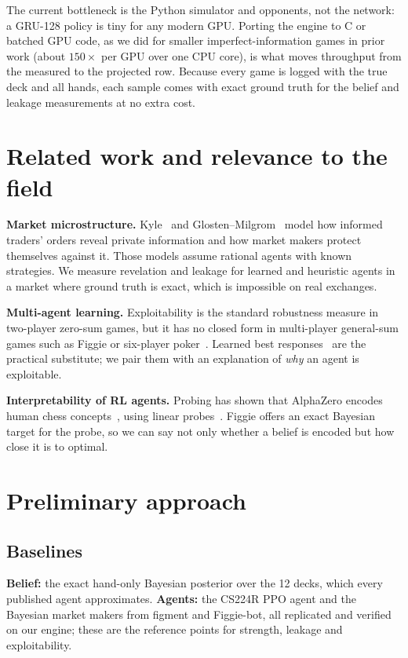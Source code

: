 \documentclass{article}
\begin{document}
The current bottleneck is the Python simulator and opponents, not the network: a GRU-128 policy is tiny for any modern GPU. Porting the engine to C or batched GPU code, as we did for smaller imperfect-information games in prior work (about $150\times$ per GPU over one CPU core), is what moves throughput from the measured to the projected row. Because every game is logged with the true deck and all hands, each sample comes with exact ground truth for the belief and leakage measurements at no extra cost.

\section{Related work and relevance to the field}
\textbf{Market microstructure.} Kyle~\cite{kyle} and Glosten--Milgrom~\cite{glosten} model how informed traders' orders reveal private information and how market makers protect themselves against it. Those models assume rational agents with known strategies. We measure revelation and leakage for learned and heuristic agents in a market where ground truth is exact, which is impossible on real exchanges.

\textbf{Multi-agent learning.} Exploitability is the standard robustness measure in two-player zero-sum games, but it has no closed form in multi-player general-sum games such as Figgie or six-player poker~\cite{pluribus}. Learned best responses~\cite{timbers} are the practical substitute; we pair them with an explanation of \emph{why} an agent is exploitable.

\textbf{Interpretability of RL agents.} Probing has shown that AlphaZero encodes human chess concepts~\cite{alphazero_probe}, using linear probes~\cite{probes}. Figgie offers an exact Bayesian target for the probe, so we can say not only whether a belief is encoded but how close it is to optimal.

\section{Preliminary approach}
\subsection{Baselines}
\textbf{Belief:} the exact hand-only Bayesian posterior over the 12 decks, which every published agent approximates. \textbf{Agents:} the CS224R PPO agent and the Bayesian market makers from figment and Figgie-bot, all replicated and verified on our engine; these are the reference points for strength, leakage and exploitability.
\end{document}
